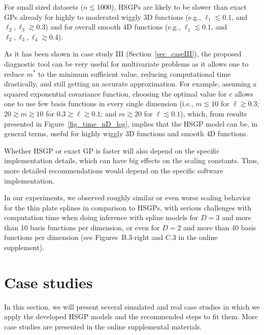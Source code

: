 {\color{blue} For small sized datasets ($n\lesssim 1000$), HSGPs are likely to be slower than exact GPs already for highly to moderated wiggly $3$D functions (e.g., $\ell_1 \lesssim 0.1$, and $\ell_2, \ell_3 \gtrsim 0.3$) and for overall smooth $4$D functions (e.g., $\ell_1 \lesssim 0.1$, and $\ell_2, \ell_3, \ell_4 \gtrsim 0.4$).}


As it has been shown in case study III (Section~\ref{sec_caseIII}), the proposed diagnostic tool can be very useful for multivariate problems as it allows one to reduce $m^*$ to the minimum sufficient value, reducing computational time drastically, and still getting an accurate approximation. {\color{blue} For example, assuming a squared exponential covariance function, choosing the optimal value for $c$ allows one to use few basis functions in every single dimension (i.e., $m \lesssim 10$ for $\ell \gtrsim 0.3$; $20 \gtrsim m \gtrsim 10$ for $0.3 \gtrsim \ell \gtrsim 0.1$; and $m \gtrsim 20$ for $\ell \lesssim 0.1$), which, from results presented in Figure~\ref{fig_time_nD_log}, implies that the HSGP model can be, in general terms, useful for highly wiggly $3$D functions and smooth $4$D functions.}

Whether HSGP or exact GP is faster will also depend on the specific implementation details, which can have big effects on the scaling constants. Thus, more detailed recommendations would depend on the specific software implementation.

In our experiments, we observed roughly similar or even worse scaling behavior for the thin plate splines in comparison to HSGPs, with serious challenges with computation time when doing inference with spline models for $D=3$ and more than 10 basis functions per dimension, or even for $D=2$ and more than 40 basis functions per dimension (see Figures~B.3-right and C.3 in the online supplement).

\section{Case studies}\label{sec_cases}

In this section, we will present several simulated and real case studies in which we apply the developed HSGP models and the recommended steps to fit them. More case studies are presented in the online supplemental materials.

